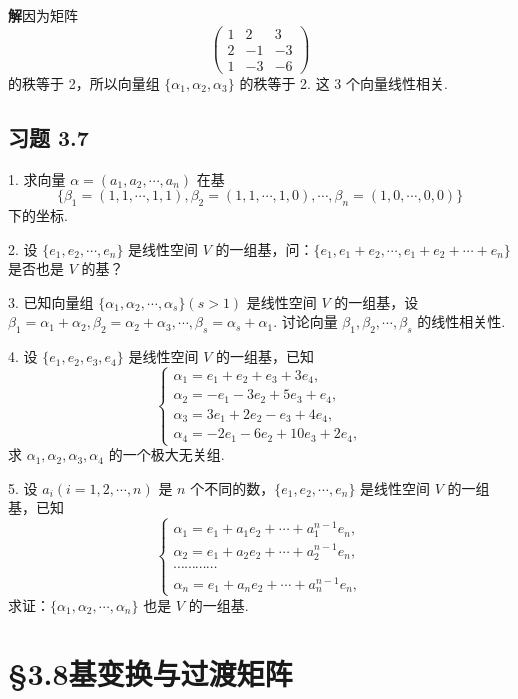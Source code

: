\documentclass[UTF8, 12pt, fontset=fandol, oneside]{ctexart}
\begin{document}
\noindent\textbf{解}\quad 因为矩阵
\[
\left(\begin{array}{rrr}
1&2&3\\
2&-1&-3\\
1&-3&-6
\end{array}\right)
\]
的秩等于 2，所以向量组 $\{\alpha_1,\alpha_2,\alpha_3\}$ 的秩等于 2. 这 3 个向量线性相关.

\subsection*{习题 3.7}

1. 求向量 $\alpha=(a_1,a_2,\cdots,a_n)$ 在基
\[
\{\beta_1=(1,1,\cdots,1,1),\beta_2=(1,1,\cdots,1,0),\cdots,\beta_n=(1,0,\cdots,0,0)\}
\]
下的坐标.

2. 设 $\{e_1,e_2,\cdots,e_n\}$ 是线性空间 $V$ 的一组基，问：$\{e_1,e_1+e_2,\cdots,e_1+e_2+\cdots+e_n\}$ 是否也是 $V$ 的基？

3. 已知向量组 $\{\alpha_1,\alpha_2,\cdots,\alpha_s\}(s>1)$ 是线性空间 $V$ 的一组基，设 $\beta_1=\alpha_1+\alpha_2,\beta_2=\alpha_2+\alpha_3,\cdots,\beta_s=\alpha_s+\alpha_1$. 讨论向量 $\beta_1,\beta_2,\cdots,\beta_s$ 的线性相关性.

4. 设 $\{e_1,e_2,e_3,e_4\}$ 是线性空间 $V$ 的一组基，已知
\[
\left\{\begin{array}{l}
\alpha_1=e_1+e_2+e_3+3e_4,\\
\alpha_2=-e_1-3e_2+5e_3+e_4,\\
\alpha_3=3e_1+2e_2-e_3+4e_4,\\
\alpha_4=-2e_1-6e_2+10e_3+2e_4,
\end{array}\right.
\]
求 $\alpha_1,\alpha_2,\alpha_3,\alpha_4$ 的一个极大无关组.

5. 设 $a_i(i=1,2,\cdots,n)$ 是 $n$ 个不同的数，$\{e_1,e_2,\cdots,e_n\}$ 是线性空间 $V$ 的一组基，已知
\[
\left\{\begin{array}{l}
\alpha_1=e_1+a_1e_2+\cdots+a_1^{n-1}e_n,\\
\alpha_2=e_1+a_2e_2+\cdots+a_2^{n-1}e_n,\\
\cdots\cdots\cdots\cdots\\
\alpha_n=e_1+a_ne_2+\cdots+a_n^{n-1}e_n,
\end{array}\right.
\]
求证：$\{\alpha_1,\alpha_2,\cdots,\alpha_n\}$ 也是 $V$ 的一组基.

\section*{§3.8\quad 基变换与过渡矩阵}
\end{document}
